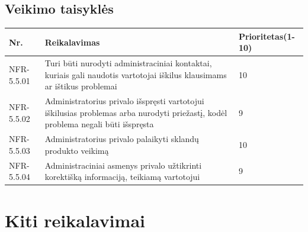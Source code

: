 \documentclass[oneside]{VUMIFPSkursinis}
\begin{document}
\subsection{Veikimo taisyklės}
\begin{table}[htbp]
	\begin{tabularx}{1\textwidth}{ |P{2.5cm}|X|P{3cm }| }  \hline
		Nr. & Reikalavimas & Prioritetas(1-10) \\ \hline
		NFR-5.5.01 & Turi būti nurodyti administraciniai kontaktai, kuriais gali naudotis vartotojai iškilus klausimams ar ištikus problemai & 10 \\ \hline
		NFR-5.5.02 & Administratorius privalo išspręsti vartotojui iškilusias problemas arba nurodyti priežastį, kodėl problema negali būti išspręsta  & 9 \\ \hline
		NFR-5.5.03 & Administratorius privalo palaikyti sklandų produkto veikimą & 10 \\ \hline
		NFR-5.5.04 & Administraciniai asmenys privalo užtikrinti korektišką informaciją, teikiamą vartotojui & 9 \\ \hline
	\end{tabularx}
\end{table}

\section{Kiti reikalavimai}
\end{document}

